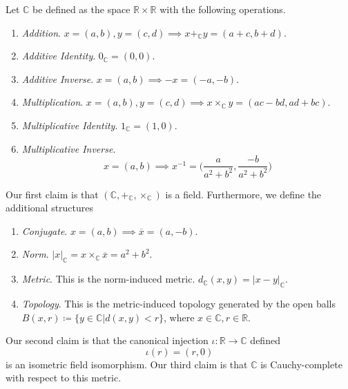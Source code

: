   \begin{theorem}
    Let $\mathbb{C}$ be defined as the space $\mathbb{R} \times \mathbb{R}$ with the following operations. 
    \begin{enumerate}
      \item \textit{Addition}. $x = (a, b), y = (c, d) \implies x +_{\mathbb{C}} y = (a + c, b + d)$. 
      \item \textit{Additive Identity}. $0_{\mathbb{C}} = (0, 0)$. 
      \item \textit{Additive Inverse}. $x = (a, b) \implies -x = (-a, -b)$. 
      \item \textit{Multiplication}. $x = (a, b), y = (c, d) \implies x \times_{\mathbb{C}} y = (ac - bd, ad + bc)$. 
      \item \textit{Multiplicative Identity}. $1_{\mathbb{C}} = (1, 0)$. 
      \item \textit{Multiplicative Inverse}. 
      \begin{equation}
        x = (a, b) \implies x^{-1} = \bigg( \frac{a}{a^2 + b^2}, \frac{-b}{a^2 + b^2} \bigg)
      \end{equation}
    \end{enumerate}
    Our first claim is that $(\mathbb{C}, +_{\mathbb{C}}, \times_{\mathbb{C}})$ is a field. Furthermore, we define the additional structures
    \begin{enumerate}
      \item \textit{Conjugate}. $x = (a, b) \implies \overline{x} = (a, -b)$. 
      \item \textit{Norm}. $|x|_{\mathbb{C}} = x \times_{\mathbb{C}} \overline{x} = a^2 + b^2$. 
      \item \textit{Metric}. This is the norm-induced metric. $d_{\mathbb{C}}(x, y) = |x - y|_{\mathbb{C}}$. 
      \item \textit{Topology}. This is the metric-induced topology generated by the open balls $B(x, r) \coloneqq \{y \in \mathbb{C} | d(x, y) < r\}$, where $x \in \mathbb{C}, r \in \mathbb{R}$. 
    \end{enumerate} 
    Our second claim is that the canonical injection $\iota: \mathbb{R} \rightarrow \mathbb{C}$ defined 
    \begin{equation}
      \iota(r) = (r, 0)
    \end{equation}
    is an isometric field isomorphism. Our third claim is that $\mathbb{C}$ is Cauchy-complete with respect to this metric. 
  \end{theorem} 

